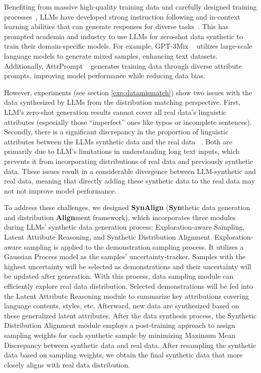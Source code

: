 Benefiting from massive high-quality training data and carefully designed training processes~\cite{ouyang2022training}, LLMs have developed strong instruction following and in-context learning abilities that can generate responses for diverse tasks~\cite{brown2020language}. This has prompted academia and industry to use LLMs for zero-shot data synthetic to train their domain-specific models. For example, GPT-3Mix ~\cite{GPT3Mix} utilizes large-scale language models to generate mixed samples, enhancing text datasets. Additionally, AttrPrompt ~\cite{attriprompt} generates training data through diverse attribute prompts, improving model performance while reducing data bias.

However, experiments (see section \ref{exp:datamismatch}) show two issues with the data synthesized by LLMs from the distribution matching perspective. First, LLM's zero-shot generation results cannot cover all real data's linguistic attributes (especially those ``imperfect'' ones like typos or incomplete sentences). Secondly, there is a significant discrepancy in the proportion of linguistic attributes between the LLMs synthetic data and the real data ~\cite{li2023synthetic, gao2025samplellm}. Both are primarily due to LLM’s limitations in understanding long text inputs, which prevents it from incorporating distributions of real data and previously synthetic data. These issues result in a considerable divergence between LLM-synthetic and real data, meaning that directly adding these synthetic data to the real data may not not improve model performance.

To address these challenges, we designed \textbf{SynAlign} (\textbf{Syn}thetic data generation and distribution \textbf{Align}ment framework), which incorporates three modules during LLMs' synthetic data generation process: Exploration-aware Sampling, Latent Attribute Reasoning, and Synthetic Distribution Alignment. 
Exploration-aware sampling is applied to the demonstration sampling process. It utilizes a Gaussian Process model as the samples' uncertainty-tracker. Samples with the highest uncertainty will be selected as demonstrations and their uncertainty will be updated after generation. With this process, data sampling module can efficiently explore real data distribution.
Selected demonstrations will be fed into the Latent Attribute Reasoning module to summarize key attributions covering language contents, styles, etc. Afterward, new data are synthesized based on these generalized latent attributes.
After the data synthesis process, the Synthetic Distribution Alignment module employs a post-training approach to assign sampling weights for each synthetic sample by minimizing Maximum Mean Discrepancy between synthetic data and real data. After resampling the synthetic data based on sampling weights, we obtain the final synthetic data that more closely aligns with real data distribution.

